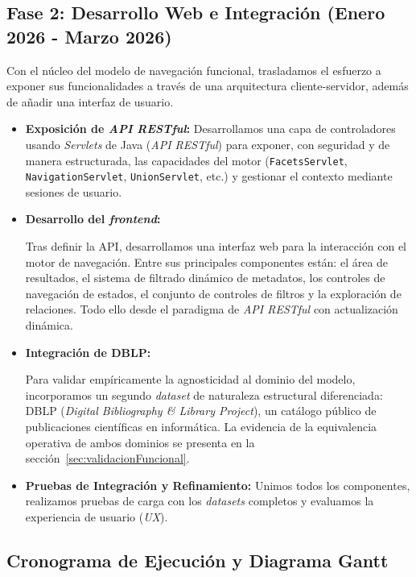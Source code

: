 \subsection{Fase 2: Desarrollo Web e Integración (Enero 2026 - Marzo 2026)}
Con el núcleo del modelo de navegación funcional, trasladamos el esfuerzo a exponer sus funcionalidades
a través de una arquitectura cliente-servidor, además de añadir una interfaz de usuario.
\begin{itemize}

\item \textbf{Exposición de \textit{API RESTful}:}
Desarrollamos una capa de controladores usando \textit{Servlets} de Java (\textit{API RESTful}) para exponer,
con seguridad y de manera estructurada, las capacidades del motor (\texttt{FacetsServlet},
\texttt{NavigationServlet}, \texttt{UnionServlet}, etc.) y gestionar el contexto mediante sesiones de usuario.

\item \textbf{Desarrollo del \textit{frontend}:}

Tras definir la API, desarrollamos una interfaz web para la interacción con el motor de navegación.
Entre sus principales componentes están: el área de resultados, el sistema de filtrado dinámico de metadatos,
los controles de navegación de estados, el conjunto de controles de filtros y la exploración de relaciones.
Todo ello desde el paradigma de \textit{API RESTful} con actualización dinámica.

\item \textbf{Integración de DBLP:}

Para validar empíricamente la agnosticidad al dominio del modelo, incorporamos un segundo
\textit{dataset} de naturaleza estructural diferenciada: DBLP (\textit{Digital Bibliography \&
Library Project}), un catálogo público de publicaciones científicas en informática. La evidencia
de la equivalencia operativa de ambos dominios se presenta en la sección~\ref{sec:validacionFuncional}.

\item \textbf{Pruebas de Integración y Refinamiento:}
Unimos todos los componentes, realizamos pruebas de carga con los \textit{datasets} completos y evaluamos la experiencia
de usuario (\textit{UX}).

\end{itemize}

\subsection{Cronograma de Ejecución y Diagrama Gantt}


